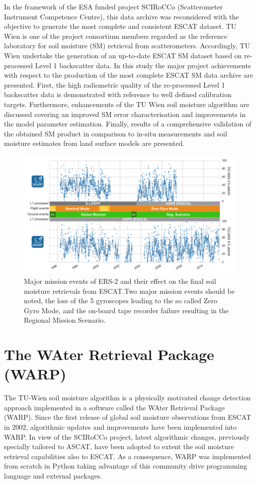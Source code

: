 \documentclass[a4paper,twocolumn]{esapub2005} %
\begin{document}
In the framework of the ESA funded project SCIRoCCo (Scatterometer Instrument Competence Centre), this data archive was reconsidered with the objective to generate the most complete and consistent ESCAT dataset.
TU Wien is one of the project consortium members regarded as the reference laboratory for soil moisture (SM) retrieval from scatterometers.
Accordingly, TU Wien undertake the generation of an up-to-date ESCAT SM dataset based on re-processed Level 1 backscatter data.
In this study the major project achievements with respect to the production of the most complete ESCAT SM data archive are presented.
First, the high radiometric quality of the re-processed Level 1 backscatter data is demonstrated with reference to well defined calibration targets.
Furthermore, enhancements of the TU Wien soil moisture algorithm are discussed covering an improved SM error characterisation and improvements in the model parameter estimation.
Finally, results of a comprehensive validation of the obtained SM product in comparison to in-situ measurements and soil moisture estimates from land surface models are presented.

\begin{figure}
  \centering
  \includegraphics[width=1.\linewidth]{../poster/figures/ERS_mission_overview.png}
  \caption{Major mission events of ERS-2 and their effect on the final soil moisture retrievals from ESCAT.\@ Two major mission events should be noted, the loss of the 5 gyroscopes leading to the so called Zero Gyro Mode, and the on-board tape recorder failure resulting in the Regional Mission Scenario.\label{figure:mission_events}}
\end{figure}

\section{The WAter Retrieval Package (WARP)}
The TU-Wien soil moisture algorithm is a physically motivated change detection approach implemented in a software called the WAter Retrieval Package (WARP).
Since the first release of global soil moisture observations from ESCAT in 2002, algorithmic updates and improvements have been implemented into WARP.
In view of the SCIRoCCo project, latest algorithmic changes, previously specially tailored to ASCAT, have been adopted to extent the soil moisture retrieval capabilities also to ESCAT.
As a consequence, WARP was implemented from scratch in Python taking advantage of this community drive programming language and external packages.
\end{document}
